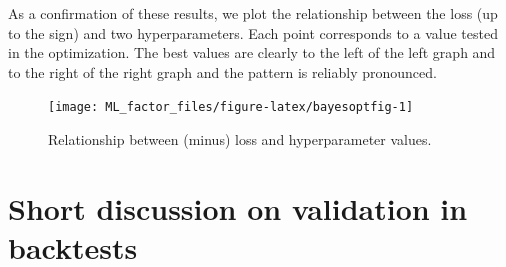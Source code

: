 \documentclass[]{krantz}
\makeatletter
\newenvironment{Shaded}{\begin{snugshade}}{\end{snugshade}}
\newcommand{\CommentTok}[1]{\textcolor[rgb]{0.37,0.37,0.37}{\textit{#1}}}
\newcommand{\DataTypeTok}[1]{\textcolor[rgb]{0.27,0.27,0.27}{#1}}
\newcommand{\DecValTok}[1]{\textcolor[rgb]{0.06,0.06,0.06}{#1}}
\newcommand{\KeywordTok}[1]{\textcolor[rgb]{0.27,0.27,0.27}{\textbf{#1}}}
\newcommand{\NormalTok}[1]{#1}
\newcommand{\OperatorTok}[1]{\textcolor[rgb]{0.43,0.43,0.43}{\textbf{#1}}}
\newcommand{\StringTok}[1]{\textcolor[rgb]{0.5,0.5,0.5}{#1}}
\newenvironment{kframe}{%
\medskip{}
\setlength{\fboxsep}{.8em}
 \def\at@end@of@kframe{}%
 \ifinner\ifhmode%
  \def\at@end@of@kframe{\end{minipage}}%
  \begin{minipage}{\columnwidth}%
 \fi\fi%
 \def\FrameCommand##1{\hskip\@totalleftmargin \hskip-\fboxsep
 \colorbox{shadecolor}{##1}\hskip-\fboxsep
     \hskip-\linewidth \hskip-\@totalleftmargin \hskip\columnwidth}%
 \MakeFramed {\advance\hsize-\width
   \@totalleftmargin\z@ \linewidth\hsize
   \@setminipage}}%
 {\par\unskip\endMakeFramed%
 \at@end@of@kframe}
\renewenvironment{Shaded}{\begin{kframe}}{\end{kframe}}
\theoremstyle{definition}
\theoremstyle{definition}
\theoremstyle{definition}
\theoremstyle{remark}
\makeatother
\begin{document}
As a confirmation of these results, we plot the relationship between the
loss (up to the sign) and two hyperparameters. Each point corresponds to
a value tested in the optimization. The best values are clearly to the
left of the left graph and to the right of the right graph and the
pattern is reliably pronounced.

\footnotesize

\begin{Shaded}
\end{Shaded}

\begin{figure}[H]

{\centering \texttt{[image: ML\_factor\_files/figure-latex/bayesoptfig-1]} 

}

\caption{Relationship between (minus) loss and hyperparameter values.}\label{fig:bayesoptfig}
\end{figure}

\normalsize

\hypertarget{short-discussion-on-validation-in-backtests}{%
\section{Short discussion on validation in
backtests}\label{short-discussion-on-validation-in-backtests}}
\end{document}
